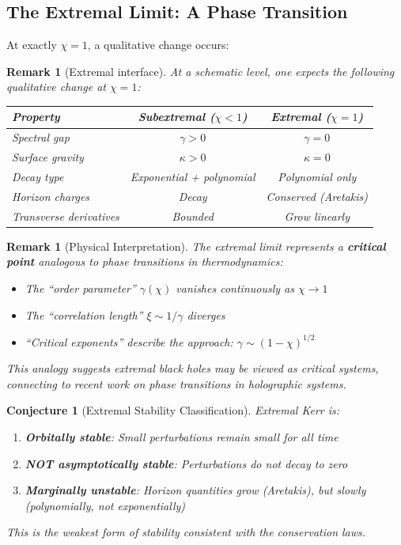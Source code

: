 \documentclass[12pt,a4paper]{article}
\newtheorem{remark}[theorem]{Remark}
\newtheorem{conjecture}[theorem]{Conjecture}
\begin{document}
\subsection{The Extremal Limit: A Phase Transition}

At exactly $\chi = 1$, a qualitative change occurs:

\begin{remark}[Extremal interface]\label{thm:extremal-transition}
At a schematic level, one expects the following qualitative change at $\chi = 1$:
\begin{center}
\renewcommand{\arraystretch}{1.3}
\begin{tabular}{@{}lcc@{}}
\toprule
\textbf{Property} & \textbf{Subextremal} ($\chi < 1$) & \textbf{Extremal} ($\chi = 1$) \\
\midrule
Spectral gap & $\gamma > 0$ & $\gamma = 0$ \\
Surface gravity & $\kappa > 0$ & $\kappa = 0$ \\
Decay type & Exponential + polynomial & Polynomial only \\
Horizon charges & Decay & Conserved (Aretakis) \\
Transverse derivatives & Bounded & Grow linearly \\
\bottomrule
\end{tabular}
\end{center}
\end{remark}

\begin{remark}[Physical Interpretation]
The extremal limit represents a \textbf{critical point} analogous to phase transitions in thermodynamics:
\begin{itemize}
    \item The ``order parameter'' $\gamma(\chi)$ vanishes continuously as $\chi \to 1$
    \item The ``correlation length'' $\xi \sim 1/\gamma$ diverges
    \item ``Critical exponents'' describe the approach: $\gamma \sim (1-\chi)^{1/2}$
\end{itemize}
This analogy suggests extremal black holes may be viewed as critical systems, connecting to recent work on phase transitions in holographic systems.
\end{remark}

\begin{conjecture}[Extremal Stability Classification]\label{conj:extremal-classification}
Extremal Kerr is:
\begin{enumerate}
    \item \textbf{Orbitally stable}: Small perturbations remain small for all time
    \item \textbf{NOT asymptotically stable}: Perturbations do not decay to zero
    \item \textbf{Marginally unstable}: Horizon quantities grow (Aretakis), but slowly (polynomially, not exponentially)
\end{enumerate}
This is the weakest form of stability consistent with the conservation laws.
\end{conjecture}
\end{document}

